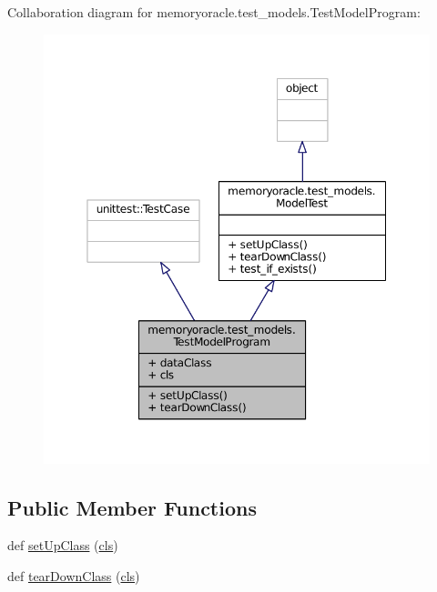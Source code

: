 Collaboration diagram for memoryoracle.\+test\+\_\+models.\+Test\+Model\+Program\+:\nopagebreak
\begin{figure}[H]
\begin{center}
\leavevmode
\includegraphics[width=350pt]{classmemoryoracle_1_1test__models_1_1TestModelProgram__coll__graph}
\end{center}
\end{figure}
\subsection*{Public Member Functions}
\begin{DoxyCompactItemize}
\item 
def \hyperlink{classmemoryoracle_1_1test__models_1_1TestModelProgram_a30399eb501d8357c99f84b39732cdd7b}{set\+Up\+Class} (\hyperlink{classmemoryoracle_1_1test__models_1_1TestModelProgram_ae554326573587b4d014cdf34da1b442e}{cls})
\item 
def \hyperlink{classmemoryoracle_1_1test__models_1_1TestModelProgram_a4bf41dbd10439a5d17a4cbbd7a3f24a2}{tear\+Down\+Class} (\hyperlink{classmemoryoracle_1_1test__models_1_1TestModelProgram_ae554326573587b4d014cdf34da1b442e}{cls})
\end{DoxyCompactItemize}
